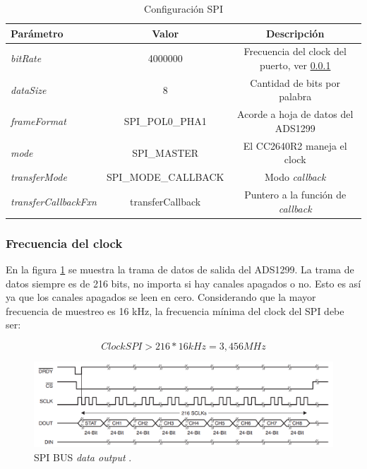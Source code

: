 \begin{table}[h]
\centering
\caption[Configuración SPI]{Configuración SPI}
\begin{tabular}{l c c}
\toprule
\textbf{Parámetro} & \textbf{Valor} & \textbf{Descripción}\\
\midrule
\textit{bitRate}              & 4000000 & Frecuencia del clock del puerto, ver \ref{subsub:clockSPI}\\ 
\textit{dataSize}             & 8 & Cantidad de bits por palabra\\
\textit{frameFormat}          & SPI\_POL0\_PHA1 & Acorde a hoja de datos del ADS1299 \citep{PART:ADS1299}\\
\textit{mode}                 & SPI\_MASTER & El CC2640R2 maneja el clock\\
\textit{transferMode}         & SPI\_MODE\_CALLBACK & Modo \textit{callback}\\
\textit{transferCallbackFxn}  & transferCallback & Puntero a la función de \textit{callback}\\
\bottomrule
\hline
\end{tabular}
\label{tab:ParamSPI}
\end{table}

\subsubsection{Frecuencia del clock}
\label{subsub:clockSPI}
En la figura \ref{fig:DataOut} se muestra la trama de datos de salida del ADS1299. La trama de datos siempre es de 216 bits, no importa si hay canales apagados o no. Esto es así ya que los canales apagados se leen en cero. Considerando que la mayor frecuencia de muestreo es 16 kHz, la frecuencia mínima del clock del SPI debe ser:

\begin{equation}
	\label{eq:bitrate}
	ClockSPI > 216 * 16 kHz = 3,456 MHz
\end{equation}

\begin{figure}[htbp]
	\centering
	\includegraphics[width=.9\textwidth]{./Figures/SPIDataOutput.png}
	\caption{SPI BUS \textit{data output} \protect\footnotemark.}
	\label{fig:DataOut}
\end{figure}

